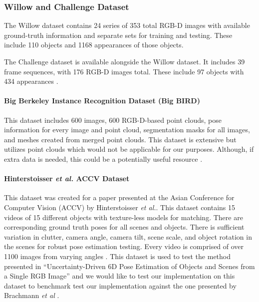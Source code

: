 \documentclass[12pt]{article}
\begin{document}
\subsubsection{Willow and Challenge
Dataset}\label{willow-and-challenge-dataset}

The Willow dataset contains 24 series of 353 total RGB-D images with
available ground-truth information and separate sets for training and
testing. These include 110 objects and 1168 appearances of those
objects.

The Challenge dataset is available alongside the Willow dataset. It
includes 39 frame sequences, with 176 RGB-D images total. These include
97 objects with 434 appearances \autocite{willowChallenge}.

\paragraph{Big Berkeley Instance Recognition Dataset (Big
BIRD)}\label{big-berkeley-instance-recognition-dataset-big-bird}

This dataset includes 600 images, 600 RGB-D-based point clouds, pose
information for every image and point cloud, segmentation masks for all
images, and meshes created from merged point clouds. This dataset is
extensive but utilizes point clouds which would not be applicable for
our purposes. Although, if extra data is needed, this could be a
potentially useful resource \autocite{bigBird}.

\paragraph{\texorpdfstring{Hinterstoisser \emph{et al.} ACCV
Dataset}{Hinterstoisser et al. ACCV Dataset}}\label{hinterstoisser-et-al.-accv-dataset}

This dataset was created for a paper presented at the Asian Conference
for Computer Vision (ACCV) by Hinterstoisser \emph{et al.}. This dataset
contains 15 videos of 15 different objects with texture-less models for
matching. There are corresponding ground truth poses for all scenes and
objects. There is sufficient variation in clutter, camera angle, camera
tilt, scene scale, and object rotation in the scenes for robust pose
estimation testing. Every video is comprised of over 1100 images from
varying angles \autocite{hinterstoisser}. This dataset is used to test
the method presented in ``Uncertainty-Driven 6D Pose Estimation of
Objects and Scenes from a Single RGB Image'' and we would like to test
our implementation on this dataset to benchmark test our implementation
against the one presented by Brachmann \emph{et al}
\autocite{brachmann}.
\end{document}
